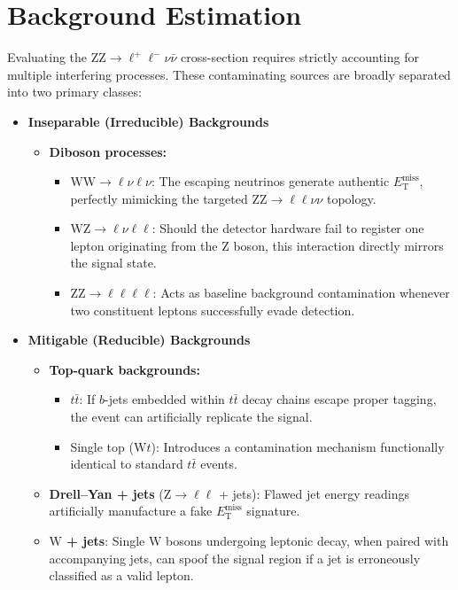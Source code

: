 \section{Background Estimation}
\label{sec:llvv_background}

Evaluating the $\text{ZZ} \to \ell^+\ell^-\nu\bar{\nu}$ cross-section requires strictly accounting for multiple interfering processes. These contaminating sources are broadly separated into two primary classes:

\begin{itemize}

    \item \textbf{Inseparable (Irreducible) Backgrounds}
    \begin{itemize}
        \item \textbf{Diboson processes:}
        \begin{itemize}
            \item $\text{WW} \to \ell\nu\ell\nu$: The escaping neutrinos generate authentic $E_{\text{T}}^{\text{miss}}$, perfectly mimicking the targeted $\text{ZZ} \to \ell\ell\nu\nu$ topology.
            \item $\text{WZ} \to \ell\nu\ell\ell$: Should the detector hardware fail to register one lepton originating from the $\text{Z}$ boson, this interaction directly mirrors the signal state.
            \item $\text{ZZ} \to \ell\ell\ell\ell$: Acts as baseline background contamination whenever two constituent leptons successfully evade detection.
        \end{itemize}
    \end{itemize}

    \item \textbf{Mitigable (Reducible) Backgrounds}
    \begin{itemize}
        \item \textbf{Top-quark backgrounds:}
        \begin{itemize}
            \item $t\bar{t}$: If $b$-jets embedded within $t\bar{t}$ decay chains escape proper tagging, the event can artificially replicate the signal.
            \item Single top ($\text{W}t$): Introduces a contamination mechanism functionally identical to standard $t\bar{t}$ events.
        \end{itemize}
        \item \textbf{Drell--Yan + jets} ($\text{Z} \to \ell\ell$ + jets): Flawed jet energy readings artificially manufacture a fake $E_{\text{T}}^{\text{miss}}$ signature.
        \item \textbf{$\text{W}$ + jets}: Single $\text{W}$ bosons undergoing leptonic decay, when paired with accompanying jets, can spoof the signal region if a jet is erroneously classified as a valid lepton.
    \end{itemize}

\end{itemize}

